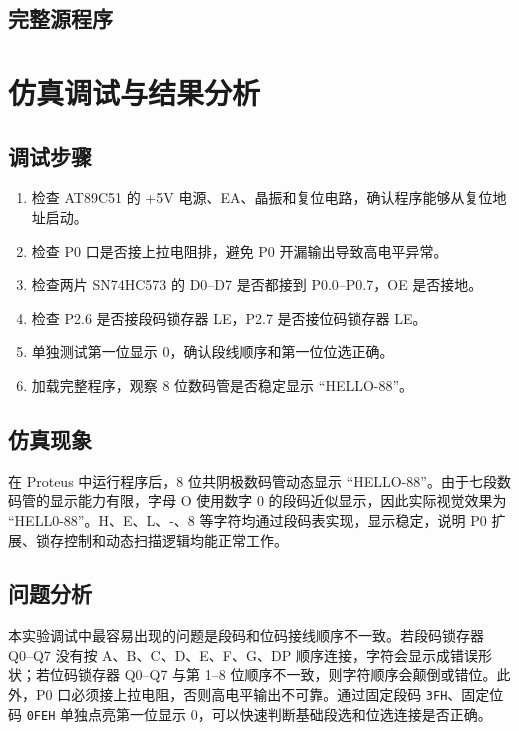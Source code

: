 \subsection{完整源程序}
\lstset{style=a51style}


\section{仿真调试与结果分析}

\subsection{调试步骤}
\begin{enumerate}
  \item 检查 AT89C51 的 +5V 电源、EA、晶振和复位电路，确认程序能够从复位地址启动。
  \item 检查 P0 口是否接上拉电阻排，避免 P0 开漏输出导致高电平异常。
  \item 检查两片 SN74HC573 的 D0--D7 是否都接到 P0.0--P0.7，OE 是否接地。
  \item 检查 P2.6 是否接段码锁存器 LE，P2.7 是否接位码锁存器 LE。
  \item 单独测试第一位显示 0，确认段线顺序和第一位位选正确。
  \item 加载完整程序，观察 8 位数码管是否稳定显示 ``HELLO-88''。
\end{enumerate}

\subsection{仿真现象}
在 Proteus 中运行程序后，8 位共阴极数码管动态显示 ``HELLO-88''。由于七段数码管的显示能力有限，字母 O 使用数字 0 的段码近似显示，因此实际视觉效果为 ``HELL0-88''。H、E、L、-、8 等字符均通过段码表实现，显示稳定，说明 P0 扩展、锁存控制和动态扫描逻辑均能正常工作。

\subsection{问题分析}
本实验调试中最容易出现的问题是段码和位码接线顺序不一致。若段码锁存器 Q0--Q7 没有按 A、B、C、D、E、F、G、DP 顺序连接，字符会显示成错误形状；若位码锁存器 Q0--Q7 与第 1--8 位顺序不一致，则字符顺序会颠倒或错位。此外，P0 口必须接上拉电阻，否则高电平输出不可靠。通过固定段码 \texttt{3FH}、固定位码 \texttt{0FEH} 单独点亮第一位显示 0，可以快速判断基础段选和位选连接是否正确。

